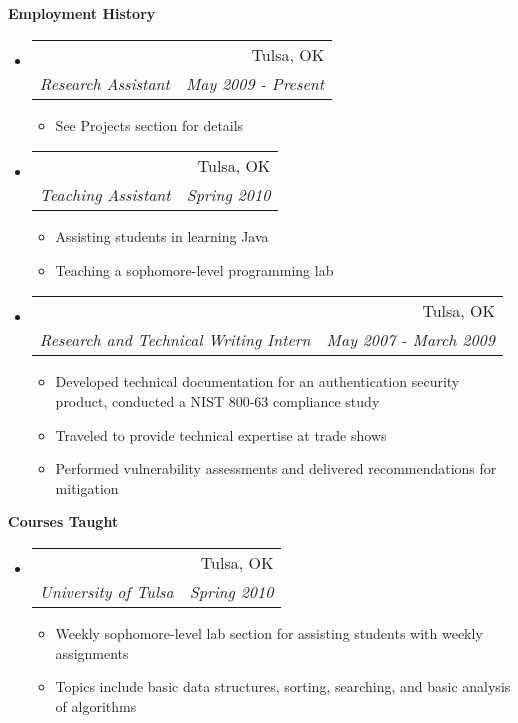 \documentclass[letterpaper,11pt]{article}
\makeatletter
\newcommand{\resitem}[1]{\item #1 \vspace{-2pt}}
\newcommand{\resheading}[1]{{\large \colorbox{mygrey}{\begin{minipage}{\textwidth}{\textbf{#1 \vphantom{p\^{E}}}}\end{minipage}}}}
\newcommand{\ressubheading}[4]{
\begin{tabular*}{6.5in}{l@{\extracolsep{\fill}}r}
		\textbf{\parbox{5in}{\raggedright #1 }} & #2 \\
		\textit{#3} & \textit{#4} \\
\end{tabular*}\vspace{-6pt}}
\makeatother
\begin{document}
\resheading{Employment History}
\begin{itemize}
\item
	\ressubheading{Institute for Information Security, TU}{Tulsa, OK}{Research Assistant}{May 2009 - Present}
	\begin{itemize}
		\resitem{See Projects section for details}
	\end{itemize}

\item
	\ressubheading{University of Tulsa}{Tulsa, OK}{Teaching Assistant}{Spring 2010}
	\begin{itemize}
		\resitem{Assisting students in learning Java}
		\resitem{Teaching a sophomore-level programming lab}
	\end{itemize}
\item
	\ressubheading{Vidoop}{Tulsa, OK}{Research and Technical Writing Intern}{May 2007 - March 2009}
	\begin{itemize}
		\resitem{Developed technical documentation for an authentication security product, conducted a NIST 800-63 compliance study}
		\resitem{Traveled to provide technical expertise at trade shows}
		\resitem{Performed vulnerability assessments and delivered recommendations for mitigation}
	\end{itemize}
\end{itemize}

\resheading{Courses Taught}
\begin{itemize}
\item
	\ressubheading{Fundamentals of Algorithm and Computer Applications Lab}{Tulsa, OK}{University of Tulsa}{Spring 2010}
	\begin{itemize}
		\resitem{Weekly sophomore-level lab section for assisting students with weekly assignments}
		\resitem{Topics include basic data structures, sorting, searching, and basic analysis of algorithms}
	\end{itemize}
\end{itemize}
\end{document}
